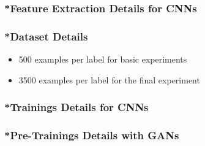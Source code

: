 \begin{frame}
  \frametitle{*Feature Extraction Details for CNNs}
  
\end{frame}

\begin{frame}
  \frametitle{*Dataset Details}
  \begin{itemize}
    \item 500 examples per label for basic experiments
    \item 3500 examples per label for the final experiment
  \end{itemize}
  
\end{frame}

\begin{frame}
  \frametitle{*Trainings Details for CNNs}
  
\end{frame}

\begin{frame}
  \frametitle{*Pre-Trainings Details with GANs}
  
\end{frame}

